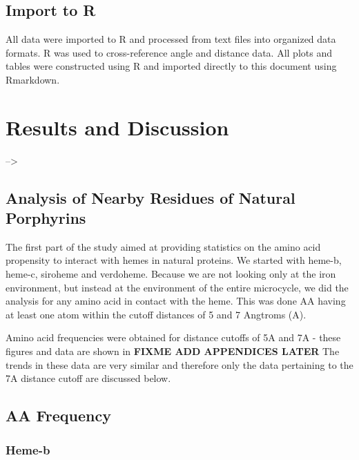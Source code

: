 \documentclass[a4paper, nobind]{templates/ociamthesis}
\begin{document}
\hypertarget{import-to-r}{%
\section{Import to R}\label{import-to-r}}

All data were imported to R and processed from text files into organized data formats. R was used to cross-reference angle and distance data. All plots and tables were constructed using R and imported directly to this document using Rmarkdown.

\adjustmtc
{}

\adjustmtc
{}

\hypertarget{discussion}{%
\chapter{Results and Discussion}\label{discussion}}

--\textgreater{}

\hypertarget{analysis-of-nearby-residues-of-natural-porphyrins}{%
\section{Analysis of Nearby Residues of Natural Porphyrins}\label{analysis-of-nearby-residues-of-natural-porphyrins}}

The first part of the study aimed at providing statistics on the amino acid propensity to interact with hemes in natural proteins. We started with heme-b, heme-c, siroheme and verdoheme. Because we are not looking only at the iron environment, but instead at the environment of the entire microcycle, we did the analysis for any amino acid in contact with the heme. This was done AA having at least one atom within the cutoff distances of 5 and 7 Angtroms (A).

Amino acid frequencies were obtained for distance cutoffs of 5A and 7A - these figures and data are shown in \textbf{FIXME ADD APPENDICES LATER} The trends in these data are very similar and therefore only the data pertaining to the 7A distance cutoff are discussed below.

\hypertarget{disc-aaFreq}{%
\section{AA Frequency}\label{disc-aaFreq}}

\hypertarget{heme-b}{%
\subsection{Heme-b}\label{heme-b}}
\end{document}
